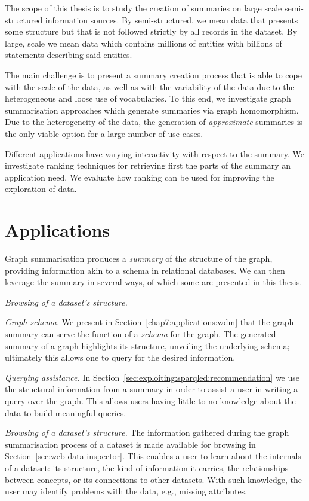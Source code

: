 The scope of this thesis is to study the creation of summaries on large scale semi-structured information sources. By semi-structured, we mean data that presents some structure but that is not followed strictly by all records in the dataset. By large, scale we mean data which contains millions of entities with billions of statements describing said entities.

The main challenge is to present a summary creation process that is able to cope with the scale of the data, as well as with the variability of the data due to the heterogeneous and loose use of vocabularies. To this end, we investigate graph summarisation approaches which generate summaries via graph homomorphism. Due to the heterogeneity of the data, the generation of \emph{approximate} summaries is the only viable option for a large number of use cases.

Different applications have varying interactivity with respect to the summary. We investigate ranking techniques for retrieving first the parts of the summary an application need. We evaluate how ranking can be used for improving the exploration of data.

\section{Applications}

Graph summarisation produces a \emph{summary} of the structure of the graph, providing information akin to a schema in relational databases. We can then leverage the summary in several ways, of which some are presented in this thesis.

\begin{labeling}{\emph{Browsing of a dataset's structure.}}
\item[\emph{Graph schema.}] We present in Section~\ref{chap7:applications:wdm} that the graph summary can serve the function of a \emph{schema} for the graph. The generated summary of a graph highlights its structure, unveiling the underlying schema; ultimately this allows one to query for the desired information.
\item[\emph{Querying assistance.}] In Section~\ref{sec:exploiting:sparqled:recommendation} we use the structural information from a summary in order to assist a user in writing a query over the graph. This allows users having little to no knowledge about the data to build meaningful queries.
\item[\emph{Browsing of a dataset's structure.}] The information gathered during the graph summarisation process of a dataset is made available for browsing in Section~\ref{sec:web-data-inspector}. This enables a user to learn about the internals of a dataset: its structure, the kind of information it carries, the relationships between concepts, or its connections to other datasets. With such knowledge, the user may identify problems with the data, e.g., missing attributes.
\end{labeling}

